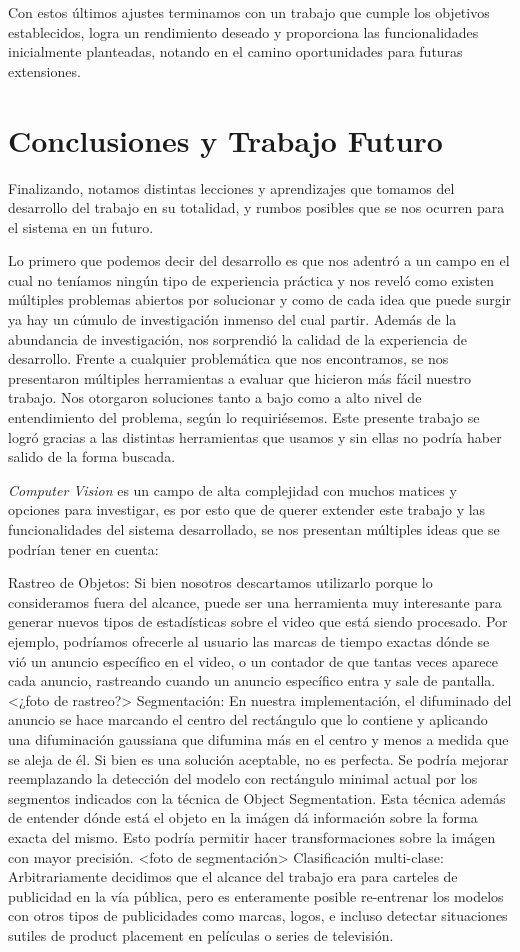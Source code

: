 \documentclass[a4paper]{article}
\begin{document}
Con estos últimos ajustes terminamos con un trabajo que cumple los objetivos establecidos, logra un rendimiento deseado y proporciona las funcionalidades inicialmente planteadas, notando en el camino oportunidades para futuras extensiones.

\section{Conclusiones y Trabajo Futuro}

Finalizando, notamos distintas lecciones y aprendizajes que tomamos del desarrollo del trabajo en su totalidad, y rumbos posibles que se nos ocurren para el sistema en un futuro.

Lo primero que podemos decir del desarrollo es que nos adentró a un campo en el cual no teníamos ningún tipo de experiencia práctica y nos reveló como existen múltiples problemas abiertos por solucionar y como de cada idea que puede surgir ya hay un cúmulo de investigación inmenso del cual partir.
Además de la abundancia de investigación, nos sorprendió la calidad de la experiencia de desarrollo. Frente a cualquier problemática que nos encontramos, se nos presentaron múltiples herramientas a evaluar que hicieron más fácil nuestro trabajo. Nos otorgaron soluciones tanto a bajo como a alto nivel de entendimiento del problema, según lo requiriésemos. Este presente trabajo se logró gracias a las distintas herramientas que usamos y sin ellas no podría haber salido de la forma buscada.

\textit{Computer Vision} es un campo de alta complejidad con muchos matices y opciones para investigar, es por esto que de querer extender este trabajo y las funcionalidades del sistema desarrollado, se nos presentan múltiples ideas que se podrían tener en cuenta:

Rastreo de Objetos: Si bien nosotros descartamos utilizarlo porque lo consideramos fuera del alcance, puede ser una herramienta muy interesante para generar nuevos tipos de estadísticas sobre el video que está siendo procesado. Por ejemplo, podríamos ofrecerle al usuario las marcas de tiempo exactas dónde se vió un anuncio específico en el video, o un contador de que tantas veces aparece cada anuncio, rastreando cuando un anuncio específico entra y sale de pantalla.
<¿foto de rastreo?>
Segmentación: En nuestra implementación, el difuminado del anuncio se hace marcando el centro del rectángulo que lo contiene y aplicando una difuminación gaussiana que difumina más en el centro y menos a medida que se aleja de él. Si bien es una solución aceptable, no es perfecta. Se podría mejorar reemplazando la detección del modelo con rectángulo minimal actual por los segmentos indicados con la técnica de Object Segmentation. Esta técnica además de entender dónde está el objeto en la imágen dá información sobre la forma exacta del mismo. Esto podría permitir hacer transformaciones sobre la imágen con mayor precisión.
	<foto de segmentación>
Clasificación multi-clase: Arbitrariamente decidimos que el alcance del trabajo era para carteles de publicidad en la vía pública, pero es enteramente posible re-entrenar los modelos con otros tipos de publicidades como marcas, logos, e incluso detectar situaciones sutiles de product placement en películas o series de televisión.
\end{document}

